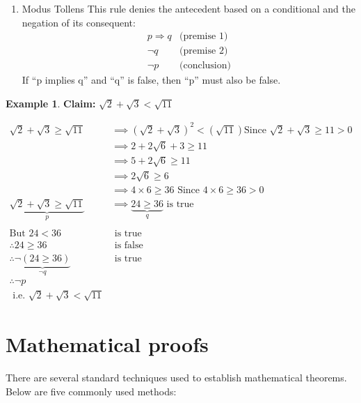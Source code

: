 \documentclass[
]{book}
\providecommand{\tightlist}{%
  \setlength{\itemsep}{0pt}\setlength{\parskip}{0pt}}
\theoremstyle{definition}
\theoremstyle{definition}
\newtheorem{example}{Example}[chapter]
\theoremstyle{definition}
\theoremstyle{definition}
\theoremstyle{remark}
\begin{document}
\begin{enumerate}
\def\labelenumi{(\roman{enumi})}
\setcounter{enumi}{1}
\tightlist
\item
  Modus Tollens
  This rule denies the antecedent based on a conditional and the negation of its consequent:
  \[
  \begin{array}{ll}
  p \Rightarrow q & \text{(premise 1)} \\
  \neg q & \text{(premise 2)} \\
  \hline
  \neg p & \text{(conclusion)}
  \end{array}
  \]
  If ``p implies q'' and ``q'' is false, then ``p'' must also be false.
\end{enumerate}

\begin{example}
\protect\hypertarget{exm:unnamed-chunk-62}{}\label{exm:unnamed-chunk-62}\textbf{Claim:} \(\sqrt{2}+\sqrt{3}<\sqrt{11}\)

\begin{align} 
\sqrt{2}+\sqrt{3}\geq \sqrt{11} & \implies (\sqrt{2}+\sqrt{3})^2<(\sqrt{11}) \text{Since }\sqrt{2}+\sqrt{3}\geq 11>0\\
& \implies 2+2\sqrt{6}+3\geq 11\\
& \implies 5+2\sqrt{6}\geq 11\\
& \implies 2\sqrt{6}\geq 6\\
& \implies 4\times 6 \geq 36 \text{ Since } 4\times 6 \geq 36>0\\
\underbrace{\sqrt{2}+\sqrt{3}\geq \sqrt{11}}_p& \implies \underbrace{24 \geq 36}_q \text{ is true}  \label{eq:eq1}\\\\
\text{But } 24 < 36 &\text{ is true}\\
\therefore 24 \geq 36 &\text{ is false}\\
\therefore \underbrace{\neg(24 \geq 36)}_{\neg q} &\text{ is true}\label{eq:eq2}\\
\therefore \neg p &\\
\text{ i.e. } \sqrt{2}+\sqrt{3}<\sqrt{11}&
\end{align}
\end{example}

\section{Mathematical proofs}\label{mathematical-proofs}

There are several standard techniques used to establish mathematical theorems. Below are five commonly used methods:
\end{document}
